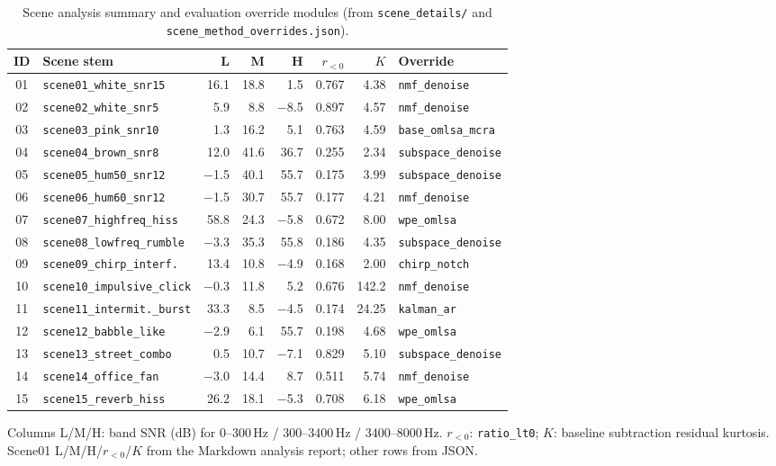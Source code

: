 \begin{table}[H]
  \centering
  \caption{Scene analysis summary and evaluation override modules (from \texttt{scene\_details/} and \texttt{scene\_method\_overrides.json}).}
  \label{tab:scene_metrics}
  \footnotesize
  \setlength{\tabcolsep}{3pt}
  \begin{tabular}{clrrrrrl}
    \toprule
    \textbf{ID} & \textbf{Scene stem} & \textbf{L} & \textbf{M} & \textbf{H} & \textbf{$r_{<0}$} & \textbf{$K$} & \textbf{Override} \\
    \midrule
    01 & \texttt{scene01\_white\_snr15}     & 16.1 & 18.8 & 1.5  & 0.767 & 4.38  & \texttt{nmf\_denoise} \\
    02 & \texttt{scene02\_white\_snr5}      & 5.9  & 8.8  & $-$8.5 & 0.897 & 4.57  & \texttt{nmf\_denoise} \\
    03 & \texttt{scene03\_pink\_snr10}      & 1.3  & 16.2 & 5.1  & 0.763 & 4.59  & \texttt{base\_omlsa\_mcra} \\
    04 & \texttt{scene04\_brown\_snr8}      & 12.0 & 41.6 & 36.7 & 0.255 & 2.34  & \texttt{subspace\_denoise} \\
    05 & \texttt{scene05\_hum50\_snr12}     & $-$1.5 & 40.1 & 55.7 & 0.175 & 3.99  & \texttt{subspace\_denoise} \\
    06 & \texttt{scene06\_hum60\_snr12}     & $-$1.5 & 30.7 & 55.7 & 0.177 & 4.21  & \texttt{nmf\_denoise} \\
    07 & \texttt{scene07\_highfreq\_hiss}   & 58.8 & 24.3 & $-$5.8 & 0.672 & 8.00  & \texttt{wpe\_omlsa} \\
    08 & \texttt{scene08\_lowfreq\_rumble}  & $-$3.3 & 35.3 & 55.8 & 0.186 & 4.35  & \texttt{subspace\_denoise} \\
    09 & \texttt{scene09\_chirp\_interf.}   & 13.4 & 10.8 & $-$4.9 & 0.168 & 2.00  & \texttt{chirp\_notch} \\
    10 & \texttt{scene10\_impulsive\_click} & $-$0.3 & 11.8 & 5.2  & 0.676 & 142.2 & \texttt{nmf\_denoise} \\
    11 & \texttt{scene11\_intermit.\_burst} & 33.3 & 8.5  & $-$4.5 & 0.174 & 24.25 & \texttt{kalman\_ar} \\
    12 & \texttt{scene12\_babble\_like}     & $-$2.9 & 6.1  & 55.7 & 0.198 & 4.68  & \texttt{wpe\_omlsa} \\
    13 & \texttt{scene13\_street\_combo}    & 0.5  & 10.7 & $-$7.1 & 0.829 & 5.10  & \texttt{subspace\_denoise} \\
    14 & \texttt{scene14\_office\_fan}      & $-$3.0 & 14.4 & 8.7  & 0.511 & 5.74  & \texttt{nmf\_denoise} \\
    15 & \texttt{scene15\_reverb\_hiss}     & 26.2 & 18.1 & $-$5.3 & 0.708 & 6.18  & \texttt{wpe\_omlsa} \\
    \bottomrule
  \end{tabular}
\end{table}
Columns L/M/H: band SNR (dB) for 0--300\,Hz / 300--3400\,Hz / 3400--8000\,Hz.
$r_{<0}$: \texttt{ratio\_lt0}; $K$: baseline subtraction residual kurtosis.
Scene01 L/M/H/$r_{<0}$/$K$ from the Markdown analysis report; other rows from JSON.
